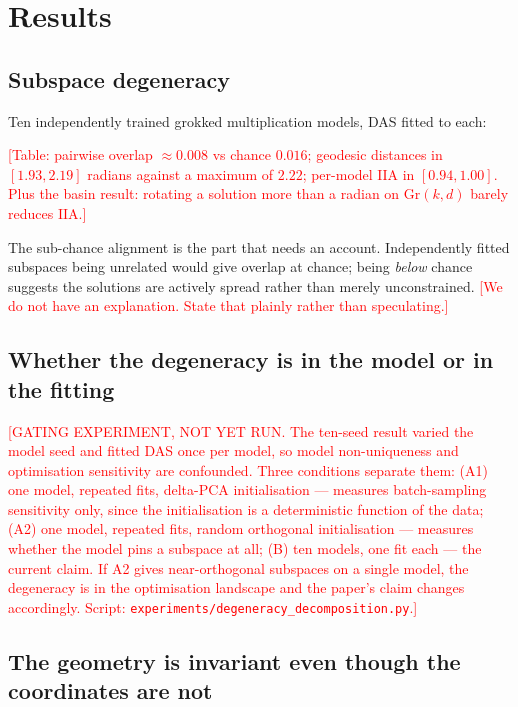 \documentclass[11pt]{article}
\newcommand{\IIA}{\mathrm{IIA}}
\newcommand{\Gr}{\mathrm{Gr}}
\newcommand{\TODO}[1]{\textcolor{red}{[#1]}}
\begin{document}
\section{Results}

\subsection{Subspace degeneracy}

Ten independently trained grokked multiplication models, DAS fitted to each:

\TODO{Table: pairwise overlap $\approx 0.008$ vs chance $0.016$; geodesic
distances in $[1.93, 2.19]$ radians against a maximum of $2.22$; per-model $\IIA$
in $[0.94, 1.00]$. Plus the basin result: rotating a solution more than a radian
on $\Gr(k,d)$ barely reduces $\IIA$.}

The sub-chance alignment is the part that needs an account. Independently fitted
subspaces being unrelated would give overlap at chance; being \emph{below} chance
suggests the solutions are actively spread rather than merely unconstrained.
\TODO{We do not have an explanation. State that plainly rather than speculating.}

\subsection{Whether the degeneracy is in the model or in the fitting}
\label{sec:decomp}

\TODO{GATING EXPERIMENT, NOT YET RUN.
The ten-seed result varied the model seed and fitted DAS once per model, so model
non-uniqueness and optimisation sensitivity are confounded. Three conditions
separate them:
(A1) one model, repeated fits, delta-PCA initialisation --- measures batch-sampling
sensitivity only, since the initialisation is a deterministic function of the data;
(A2) one model, repeated fits, random orthogonal initialisation --- measures
whether the model pins a subspace at all;
(B) ten models, one fit each --- the current claim.
If A2 gives near-orthogonal subspaces on a single model, the degeneracy is in the
optimisation landscape and the paper's claim changes accordingly.
Script: \texttt{experiments/degeneracy\_decomposition.py}.}

\subsection{The geometry is invariant even though the coordinates are not}
\end{document}

